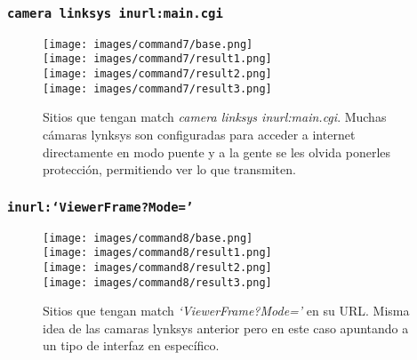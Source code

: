 \documentclass[11pt]{utalcaDoc}
\begin{document}
\subsubsection{\texttt{camera linksys inurl:main.cgi}}
\begin{figure}[H]
	\centering
\begin{multicols}{4}
	\texttt{[image: images/command7/base.png]}\\
	\texttt{[image: images/command7/result1.png]}\\
	\texttt{[image: images/command7/result2.png]}\\
	\texttt{[image: images/command7/result3.png]}\\
\end{multicols}
\caption{Sitios que tengan match \textit{camera linksys inurl:main.cgi}. Muchas cámaras lynksys son configuradas para acceder a internet directamente en modo puente y a la gente se les olvida ponerles protección, permitiendo ver lo que transmiten.}
\label{FIG:command7}
\end{figure}



\subsubsection{\texttt{inurl:\enquote*{ViewerFrame?Mode=}}}
\begin{figure}[H]
	\centering
\begin{multicols}{4}
	\texttt{[image: images/command8/base.png]}\\
	\texttt{[image: images/command8/result1.png]}\\
	\texttt{[image: images/command8/result2.png]}\\
	\texttt{[image: images/command8/result3.png]}\\
\end{multicols}
\caption{Sitios que tengan match \textit{\enquote*{ViewerFrame?Mode=}} en su URL. Misma idea de las camaras lynksys anterior pero en este caso apuntando a un tipo de interfaz en específico.}
\label{FIG:command8}
\end{figure}
\end{document}
